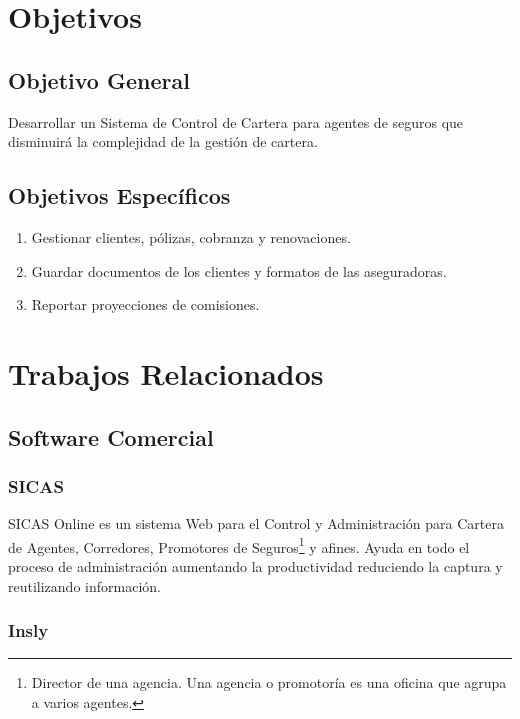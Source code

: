 \section{Objetivos}
\subsection*{Objetivo General}
Desarrollar un Sistema de Control de Cartera para agentes de seguros que disminuirá la complejidad de la gestión de cartera.
\subsection*{Objetivos Específicos}
\begin{enumerate}
	\item Gestionar clientes, pólizas, cobranza y renovaciones.
	\item Guardar documentos de los clientes y formatos de las aseguradoras.
	\item Reportar proyecciones de comisiones.
\end{enumerate}

\section{Trabajos Relacionados}
\subsection*{Software Comercial}
\subsubsection*{SICAS \cite{www:sicas}} 

SICAS Online es un sistema Web para el Control y Administración para Cartera de Agentes, Corredores, Promotores de Seguros\footnote{Director de una agencia. Una agencia o promotor\'ia es una oficina que agrupa a varios agentes.} y afines. Ayuda en todo el proceso de administración aumentando la productividad reduciendo la captura y reutilizando información.

\subsubsection*{Insly \cite{www:insly}}

